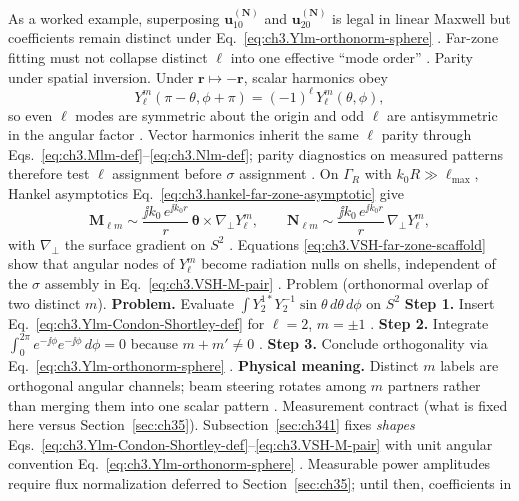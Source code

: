 As a worked example, superposing \(\mathbf{u}_{10}^{(\mathbf{N})}\) and \(\mathbf{u}_{20}^{(\mathbf{N})}\) is legal in linear Maxwell
but coefficients remain distinct under Eq.~\eqref{eq:ch3.Ylm-orthonorm-sphere} . Far-zone
fitting must not collapse distinct \(\ell\) into one effective ``mode order'' .
Parity under spatial inversion. Under \(\mathbf{r}\mapsto-\mathbf{r}\), scalar harmonics obey
\begin{equation}
\label{eq:ch3.Ylm-parity}
Y_{\ell}^{m}(\pi-\theta,\phi+\pi)
=
(-1)^{\ell}\,Y_{\ell}^{m}(\theta,\phi),
\end{equation}
so even \(\ell\) modes are symmetric about the origin and odd \(\ell\) are antisymmetric in the angular factor
. Vector harmonics inherit the same \(\ell\) parity through
Eqs.~\eqref{eq:ch3.Mlm-def}--\eqref{eq:ch3.Nlm-def}; parity diagnostics on measured patterns therefore test
\(\ell\) assignment before \(\sigma\) assignment .
On \(\Gamma_R\) with \(k_{0}R\gg\ell_{\max}\), Hankel asymptotics Eq.~\eqref{eq:ch3.hankel-far-zone-asymptotic} give
\begin{equation}
\label{eq:ch3.VSH-far-zone-scaffold}
\mathbf{M}_{\ell m}\sim
\frac{\jj k_{0}\,e^{\jj k_{0}r}}{r}\,
\boldsymbol{\theta}\times\nabla_{\perp}Y_{\ell}^{m},
\qquad
\mathbf{N}_{\ell m}\sim
\frac{\jj k_{0}\,e^{\jj k_{0}r}}{r}\,
\nabla_{\perp}Y_{\ell}^{m},
\end{equation}
with \(\nabla_{\perp}\) the surface gradient on \(S^{2}\) . Equations
\eqref{eq:ch3.VSH-far-zone-scaffold} show that angular nodes of \(Y_{\ell}^{m}\) become radiation nulls on shells,
independent of the \(\sigma\) assembly in Eq.~\eqref{eq:ch3.VSH-M-pair} .
Problem (orthonormal overlap of two distinct \(m\)). \textbf{Problem.} Evaluate \(\int Y_{2}^{1*}Y_{2}^{-1}\sin\theta\,d\theta\,d\phi\) on \(S^{2}\)
\textbf{Step 1.} Insert Eq.~\eqref{eq:ch3.Ylm-Condon-Shortley-def} for \(\ell=2\), \(m=\pm1\) .
\textbf{Step 2.} Integrate \(\int_{0}^{2\pi}e^{-\jj\phi}e^{-\jj\phi}\,d\phi=0\) because \(m+m'\neq0\) .
\textbf{Step 3.} Conclude orthogonality via Eq.~\eqref{eq:ch3.Ylm-orthonorm-sphere} .
\textbf{Physical meaning.} Distinct \(m\) labels are orthogonal angular channels; beam steering rotates among
\(m\) partners rather than merging them into one scalar pattern .
Measurement contract (what is fixed here versus Section~\ref{sec:ch35}). Subsection~\ref{sec:ch341} fixes \emph{shapes} Eqs.~\eqref{eq:ch3.Ylm-Condon-Shortley-def}--\eqref{eq:ch3.VSH-M-pair}
with unit angular convention Eq.~\eqref{eq:ch3.Ylm-orthonorm-sphere} . Measurable power
amplitudes require flux normalization deferred to Section~\ref{sec:ch35}; until then, coefficients in
